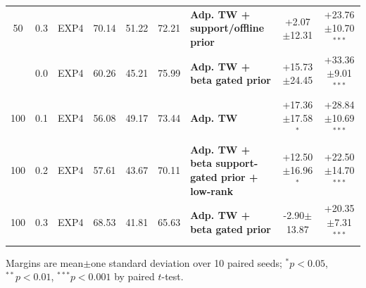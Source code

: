 \begin{table}[t]
{\begin{tabular}{cclccclcc}
50 & 0.3 & EXP4 & 70.14 & 51.22 & 72.21 & \textbf{Adp. TW + support/offline prior} & +2.07$\pm$12.31 & +23.76$\pm$10.70$^{***}$ \\
\addlinespace
100 & 0.0 & EXP4 & 60.26 & 45.21 & 75.99 & \textbf{Adp. TW + beta gated prior} & +15.73$\pm$24.45 & +33.36$\pm$9.01$^{***}$ \\
100 & 0.1 & EXP4 & 56.08 & 49.17 & 73.44 & \textbf{Adp. TW} & +17.36$\pm$17.58$^{*}$ & +28.84$\pm$10.69$^{***}$ \\
100 & 0.2 & EXP4 & 57.61 & 43.67 & 70.11 & \textbf{Adp. TW + beta support-gated prior + low-rank} & +12.50$\pm$16.96$^{*}$ & +22.50$\pm$14.70$^{***}$ \\
100 & 0.3 & EXP4 & 68.53 & 41.81 & 65.63 & \textbf{Adp. TW + beta gated prior} & -2.90$\pm$13.87 & +20.35$\pm$7.31$^{***}$ \\
\bottomrule
\end{tabular}%
}
\vspace{0.25em}
\footnotesize{Margins are mean$\pm$one standard deviation over 10 paired seeds; $^{*}p<0.05$, $^{**}p<0.01$, $^{***}p<0.001$ by paired $t$-test.}
\end{table}
